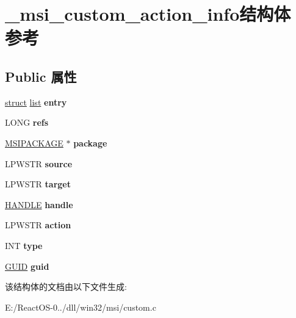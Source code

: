 \hypertarget{struct__msi__custom__action__info}{}\section{\+\_\+msi\+\_\+custom\+\_\+action\+\_\+info结构体 参考}
\label{struct__msi__custom__action__info}
\subsection*{Public 属性}
\begin{DoxyCompactItemize}
\item 
\mbox{\label{struct__msi__custom__action__info_a89ecb4dc68aed715c8ac36c7ebc0c21b}} 
\hyperlink{interfacestruct}{struct} \hyperlink{classlist}{list} {\bfseries entry}
\item 
\mbox{\label{struct__msi__custom__action__info_addf3f3bca0d782affa38a9f2f481f048}} 
L\+O\+NG {\bfseries refs}
\item 
\mbox{\label{struct__msi__custom__action__info_acf85f204555befefe43dafe95af8368e}} 
\hyperlink{structtag_m_s_i_p_a_c_k_a_g_e}{M\+S\+I\+P\+A\+C\+K\+A\+GE} $\ast$ {\bfseries package}
\item 
\mbox{\label{struct__msi__custom__action__info_af95a08d43fb57035245041182cdd277c}} 
L\+P\+W\+S\+TR {\bfseries source}
\item 
\mbox{\label{struct__msi__custom__action__info_ad23c61fae6c3c6f3f07ef51e35c5cad9}} 
L\+P\+W\+S\+TR {\bfseries target}
\item 
\mbox{\label{struct__msi__custom__action__info_a02bb7ea1b38c86587ab13e35dd1fc3b5}} 
\hyperlink{interfacevoid}{H\+A\+N\+D\+LE} {\bfseries handle}
\item 
\mbox{\label{struct__msi__custom__action__info_a327d7d589f42a9f21ddcf8d4a7156597}} 
L\+P\+W\+S\+TR {\bfseries action}
\item 
\mbox{\label{struct__msi__custom__action__info_aa2a893a03f556151eb017ff35828f564}} 
I\+NT {\bfseries type}
\item 
\mbox{\label{struct__msi__custom__action__info_a0eb165b380489950e04973ae69b26f93}} 
\hyperlink{interface_g_u_i_d}{G\+U\+ID} {\bfseries guid}
\end{DoxyCompactItemize}


该结构体的文档由以下文件生成\+:\begin{DoxyCompactItemize}
\item 
E\+:/\+React\+O\+S-\/0../dll/win32/msi/custom.\+c\end{DoxyCompactItemize}
